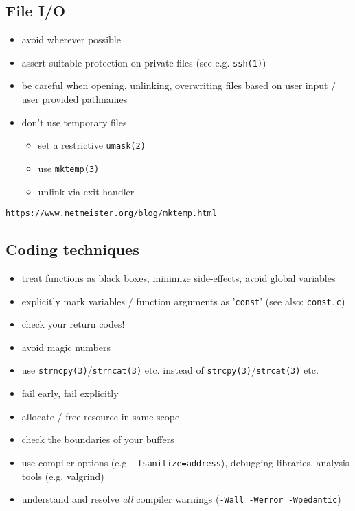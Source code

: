 \documentclass[xga]{xdvislides}
\begin{document}
\subsection{File I/O}

\begin{itemize}
	\item avoid wherever possible
	\item assert suitable protection on private files (see e.g. \verb+ssh(1)+)
	\item be careful when opening, unlinking, overwriting files based on user input / user provided pathnames
	\item don't use temporary files
		\begin{itemize}
			\item set a restrictive \verb+umask(2)+
			\item use \verb+mktemp(3)+
			\item unlink via exit handler
		\end{itemize}
\end{itemize}

\verb+https://www.netmeister.org/blog/mktemp.html+

\subsection{Coding techniques}
\begin{itemize}
	\item treat functions as black boxes, minimize side-effects, avoid global variables
	\item explicitly mark variables / function arguments as '\verb+const+' (see also: \verb+const.c+)
	\item check your return codes!
	\item avoid magic numbers
	\item use \verb+strncpy(3)+/\verb+strncat(3)+ etc. instead of \verb+strcpy(3)+/\verb+strcat(3)+ etc.
	\item fail early, fail explicitly
	\item allocate / free resource in same scope
	\item check the boundaries of your buffers
	\item use compiler options (e.g. \verb+-fsanitize=address+), debugging libraries, analysis tools (e.g. valgrind)
	\item understand and resolve {\em all} compiler warnings (\verb+-Wall -Werror -Wpedantic+)
\end{itemize}
\end{document}
